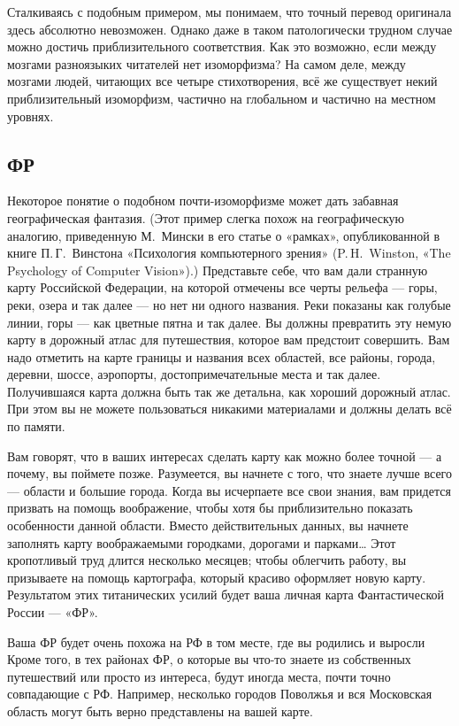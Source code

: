 \documentclass[../main.tex]{subfiles}
\begin{document}
Сталкиваясь с подобным примером, мы понимаем, что точный перевод оригинала здесь абсолютно невозможен. Однако даже в таком патологически трудном случае можно достичь приблизительного соответствия. Как это возможно, если между мозгами разноязыких читателей нет изоморфизма? На самом деле, между мозгами людей, читающих все четыре стихотворения, всё же существует некий приблизительный изоморфизм, частично на глобальном и частично на местном уровнях.


\subsection{ФР}

Некоторое понятие о подобном почти-изоморфизме может дать забавная географическая фантазия. (Этот пример слегка похож на географическую аналогию, приведенную М.~Мински в его статье о «рамках», опубликованной в книге П.\,Г.~Винстона «Психология компьютерного зрения» (P.\,H.~Winston, «The Psychology of Computer Vision»).) Представьте себе, что вам дали странную карту Российской Федерации, на которой отмечены все черты рельефа --- горы, реки, озера и так далее --- но нет ни одного названия. Реки показаны как голубые линии, горы --- как цветные пятна и так далее. Вы должны превратить эту немую карту в дорожный атлас для путешествия, которое вам предстоит совершить. Вам надо отметить на карте границы и названия всех областей, все районы, города, деревни, шоссе, аэропорты, достопримечательные места и так далее. Получившаяся карта должна быть так же детальна, как хороший дорожный атлас. При этом вы не можете пользоваться никакими материалами и должны делать всё по памяти.

Вам говорят, что в ваших интересах сделать карту как можно более точной --- а почему, вы поймете позже. Разумеется, вы начнете с того, что знаете лучше всего --- области и большие города. Когда вы исчерпаете все свои знания, вам придется призвать на помощь воображение, чтобы хотя бы приблизительно показать особенности данной области. Вместо действительных данных, вы начнете заполнять карту воображаемыми городками, дорогами и парками\ldots{} Этот кропотливый труд длится несколько месяцев; чтобы облегчить работу, вы призываете на помощь картографа, который красиво оформляет новую карту. Результатом этих титанических усилий будет ваша личная карта Фантастической России --- «ФР».

Ваша ФР будет очень похожа на РФ в том месте, где вы родились и выросли Кроме того, в тех районах ФР, о которые вы что-то знаете из собственных путешествий или просто из интереса, будут иногда места, почти точно совпадающие с РФ\@. Например, несколько городов Поволжья и вся Московская область могут быть верно представлены на вашей карте.
\end{document}
